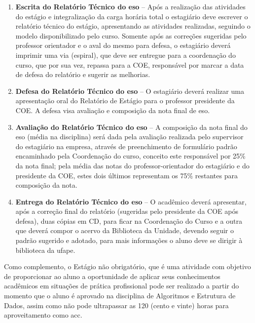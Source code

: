 \documentclass[
	12pt,				%
	openright,			%
  oneside,     %
	a4paper,			%
 hyphens,
	chapter=TITLE,		%
	english,			%
	french,				%
	spanish,			%
	brazil				%
	]{abntex2}
\begin{document}
\begin{enumerate}
    \item \textbf{Escrita do Relatório Técnico do \acrshort{eso}} – Após a realização das atividades do estágio e integralização da carga horária total o estagiário deve escrever o relatório técnico do estágio, apresentando as atividades realizadas, seguindo o modelo disponibilizado pelo curso. Somente após as correções sugeridas pelo professor orientador e o aval do mesmo para defesa, o estagiário deverá imprimir uma via (espiral), que deve ser entregue para a coordenação do curso, que por sua vez, repassa para a COE, responsável por marcar a data de defesa do relatório e sugerir as melhorias.
    \item \textbf{Defesa do Relatório Técnico do \acrshort{eso}} – O estagiário deverá realizar uma apresentação oral do Relatório de Estágio para o professor presidente da COE. A defesa visa avaliação e composição da nota final de \acrshort{eso}.
    \item \textbf{Avaliação do Relatório Técnico do \acrshort{eso}} – A composição da nota final do \acrshort{eso} (média na disciplina) será dada pela avaliação realizada pelo supervisor do estagiário na empresa, através de preenchimento de formulário padrão encaminhado pela Coordenação do curso, conceito este responsável por 25\% da nota final; pela média das notas do professor-orientador do estagiário e do presidente da COE, estes dois últimos representam os 75\% restantes para composição da nota.
    \item \textbf{Entrega do Relatório Técnico do \acrshort{eso}} – O acadêmico deverá apresentar, após a correção final do relatório (sugeridas pelo presidente da COE após defesa), duas cópias em CD, para ficar na Coordenação do Curso e a outra que deverá compor o acervo da Biblioteca da Unidade, devendo seguir o padrão sugerido e adotado, para mais informações o aluno deve se dirigir à biblioteca da \acrshort{ufape}.
\end{enumerate}

Como complemento, o Estágio não obrigatório, que é uma atividade com objetivo de proporcionar ao aluno a oportunidade de aplicar seus conhecimentos acadêmicos em situações de prática profissional pode ser realizado a partir do momento que o aluno é aprovado na disciplina de Algoritmos e Estrutura de Dados, assim como não pode ultrapassar as 120 (cento e vinte) horas para aproveitamento como \acrlong{acc}.




%
%
\end{document}
